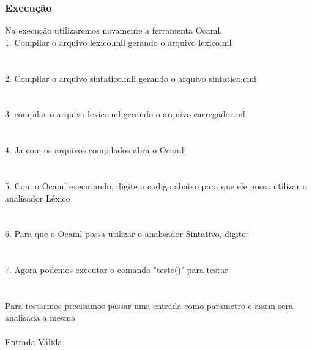 \documentclass{article}
\begin{document}
\subsubsection{Execução}
Na execução utilizaremos novamente a ferramenta Ocaml.\\

1. Compilar o arquivo lexico.mll gerando o arquivo lexico.ml\\
\\\\

2. Compilar o arquivo sintatico.mli gerando o arquivo sintatico.cmi\\
\\\\

3. compilar o arquivo lexico.ml gerando o arquivo carregador.ml\\
\\\\

4. Ja com os arquivos compilados abra o Ocaml\\
\\\\

5. Com o Ocaml executando, digite o codigo abaixo para que ele possa utilizar o analisador Léxico\\
\\\\

6. Para que o Ocaml possa utilizar o analisador Sintativo, digite:\\
\\\\

7. Agora podemos executar o comando "teste()" para testar\\
\\\\

Para testarmos precisamos passar uma entrada como parametro e assim sera analisada a mesma\\\\

Entrada Válida\\
\\\\
\end{document}
